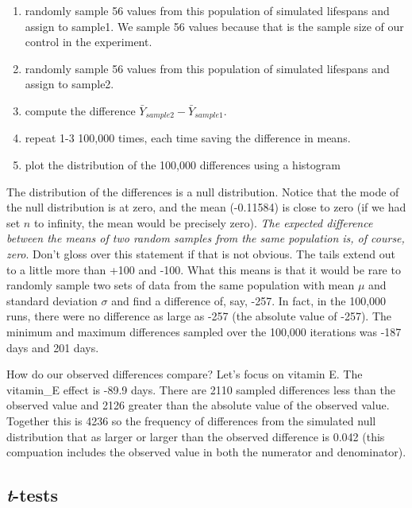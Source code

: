 \documentclass[]{book}
\providecommand{\tightlist}{%
  \setlength{\itemsep}{0pt}\setlength{\parskip}{0pt}}
\begin{document}
\begin{enumerate}
\def\labelenumi{\arabic{enumi}.}
\tightlist
\item
  randomly sample 56 values from this population of simulated lifespans
  and assign to sample1. We sample 56 values because that is the sample
  size of our control in the experiment.
\item
  randomly sample 56 values from this population of simulated lifespans
  and assign to sample2.
\item
  compute the difference \(\bar{Y}_{sample2} - \bar{Y}_{sample1}\).
\item
  repeat 1-3 100,000 times, each time saving the difference in means.
\item
  plot the distribution of the 100,000 differences using a histogram
\end{enumerate}

The distribution of the differences is a null distribution. Notice that
the mode of the null distribution is at zero, and the mean (-0.11584) is
close to zero (if we had set \(n\) to infinity, the mean would be
precisely zero). \emph{The expected difference between the means of two
random samples from the same population is, of course, zero}. Don't
gloss over this statement if that is not obvious. The tails extend out
to a little more than +100 and -100. What this means is that it would be
rare to randomly sample two sets of data from the same population with
mean \(\mu\) and standard deviation \(\sigma\) and find a difference of,
say, -257. In fact, in the 100,000 runs, there were no difference as
large as \textbar{}-257\textbar{} (the absolute value of -257). The
minimum and maximum differences sampled over the 100,000 iterations was
-187 days and 201 days.

How do our observed differences compare? Let's focus on vitamin E. The
vitamin\_E effect is -89.9 days. There are 2110 sampled differences less
than the observed value and 2126 greater than the absolute value of the
observed value. Together this is 4236 so the frequency of differences
from the simulated null distribution that as larger or larger than the
observed difference is 0.042 (this compuation includes the observed
value in both the numerator and denominator).

\subsection{\texorpdfstring{\emph{t}-tests}{t-tests}}\label{t-tests}
\end{document}

